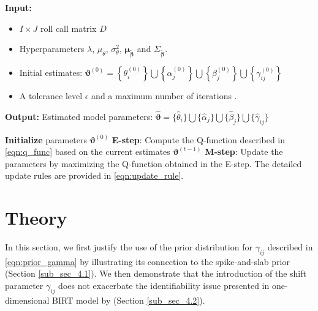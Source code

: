 \documentclass[11pt]{article}
\begin{document}
 
\begin{algorithm}
    \caption{Expectation-Maximization (EM) Algorithm for the robust BIRT model}\label{alg:EM}
    \textbf{Input:}  
    \begin{itemize}
        \item $I \times J$ roll call matrix $D$
        \item Hyperparameters $\lambda$, $\mu_{\theta}$, $\sigma_\theta^2$, $\boldsymbol{\mu}_{\boldsymbol{\tilde{\beta}}}$ and $\Sigma_{\boldsymbol{\tilde{\beta}}}$.
        \item Initial estimates:  
        $\boldsymbol{\vartheta}^{(0)} = \left\{\theta_i^{(0)}\right\} \bigcup \left\{\alpha_j^{(0)}\right\} \bigcup \left\{\beta_j^{(0)}\right\} \bigcup \left\{\gamma_{ij}^{(0)}\right\}$
        \item A tolerance level $\epsilon$ and a maximum number of iterations .
    \end{itemize}
    
    \textbf{Output:}  
    Estimated model parameters:  
    $\hat{\boldsymbol{\vartheta}} = \{\hat{\theta}_i\} \bigcup \{\hat{\alpha}_j\} \bigcup \{\hat{\beta}_j\} \bigcup \{\hat{\gamma}_{ij}\}$
    
    \begin{algorithmic}[1]     
        \State \textbf{Initialize} parameters $\boldsymbol{\vartheta}^{(0)}$
        \Repeat
            \State \textbf{E-step}: Compute the Q-function described in \eqref{eqn:q_func} based on the current estimates $\boldsymbol{\vartheta}^{(t-1)}$
            \State \textbf{M-step}: Update the parameters by maximizing the Q-function obtained in the E-step. The detailed update rules are provided in \eqref{eqn:update_rule}.
    \end{algorithmic}
\end{algorithm}



\section{Theory} \label{sec_4}
In this section, we first justify the use of the prior distribution for $ \gamma_{ij} $ described in \eqref{eqn:prior_gamma} by illustrating its connection to the spike-and-slab prior (Section \ref{sub_sec_4.1}). We then demonstrate that the introduction of the shift parameter $ \gamma_{ij} $ does not exacerbate the identifiability issue presented in one-dimensional BIRT model by \cite{Clinton2004} (Section \ref{sub_sec_4.2}).
\end{document}
